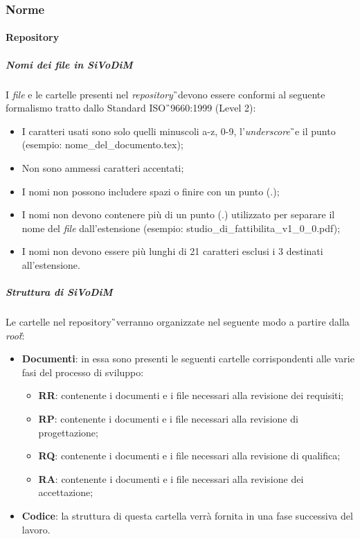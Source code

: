 \subsubsection{Norme}
\paragraph{Repository}
\subparagraph{Nomi dei file in SiVoDiM} I \textit{file} e le cartelle presenti
nel \textit{repository}\G\ devono essere conformi al seguente formalismo tratto dallo Standard
ISO\G\ 9660:1999 (Level 2):
\begin{itemize}
\item I caratteri usati sono solo quelli minuscoli a-z, 0-9, l’\textit{underscore}\G\ e il punto (esempio: nome\_del\_documento.tex);
\item Non sono ammessi caratteri accentati;
\item I nomi non possono includere spazi o finire con un punto (.);
\item I nomi non devono contenere più di un punto (.) utilizzato per separare il nome del \textit{file} dall'estensione (esempio: studio\_di\_fattibilita\_v1\_0\_0.pdf);
\item I nomi non devono essere più lunghi di 21 caratteri esclusi i 3 destinati all’estensione.
\end{itemize}

\subparagraph{Struttura di SiVoDiM}  Le cartelle nel repository\G\ verranno organizzate nel seguente modo a partire dalla \textit{root}\G:
\begin{itemize}
\item \textbf{Documenti}: in essa sono presenti le seguenti cartelle corrispondenti alle varie fasi del processo di sviluppo:
\begin{itemize}
\item \textbf{RR}: contenente i documenti e i file necessari alla revisione dei requisiti;
\item \textbf{RP}: contenente i documenti e i file necessari alla revisione di progettazione;
\item \textbf{RQ}: contenente i documenti e i file necessari alla revisione di qualifica;
\item \textbf{RA}: contenente i documenti e i file necessari alla revisione dei accettazione;
\end{itemize}
\item \textbf{Codice}: la struttura di questa cartella verrà fornita in una fase successiva del lavoro.
\end{itemize}

